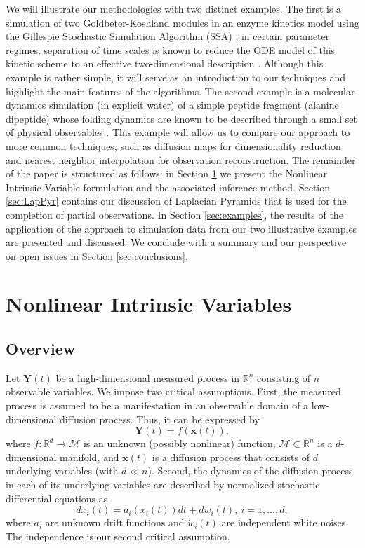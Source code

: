 \documentclass[aip,jcp,preprint]{revtex4-1}
\begin{document}
We will illustrate our methodologies with two distinct examples.
%
The first is a simulation
of two Goldbeter-Koshland modules in an enzyme kinetics model using the Gillespie Stochastic Simulation
Algorithm (SSA) \cite{gillespie1977exact};
in certain parameter regimes, separation of time scales is known
to reduce the ODE model of this kinetic scheme to an effective two-dimensional description \cite{zagaris2012stability}.
%
Although this example is rather simple, it will serve as an introduction to our techniques and highlight the main features of the algorithms.
%
The second example is a molecular dynamics
simulation (in explicit water) of a simple peptide fragment (alanine dipeptide) whose folding
dynamics are known to be described through a small set of physical observables \cite{bolhuis2000reaction}.
%
This example will allow us to compare our approach to more common techniques,
such as diffusion maps \cite{coifman2005geometric} for dimensionality reduction
and nearest neighbor interpolation for observation reconstruction.
%
The remainder of the paper is structured as follows: in Section \ref{sec:NIV} we present the Nonlinear Intrinsic Variable formulation and
the associated inference method.
%
Section \ref{sec:LapPyr} contains our discussion of Laplacian Pyramids that
is used for the completion of partial observations.
%
In Section \ref{sec:examples}, the results
of the application of the approach to simulation data from our two illustrative examples are presented and discussed.
%
We conclude with a summary and our perspective on open issues in Section \ref{sec:conclusions}.

\section{Nonlinear Intrinsic Variables} \label{sec:NIV}

\subsection{Overview}
Let $\mathbf{Y}(t)$ be a high-dimensional measured process in $\mathbb{R}^n$ consisting of $n$ observable variables.
%
We impose two critical assumptions. First, the measured process is assumed to be a manifestation in an observable domain of a low-dimensional diffusion process. Thus, it can be expressed by
\begin{equation}
	\mathbf{Y}(t) = f(\mathbf{x}(t)),
\end{equation}
where $f:\mathbb{R}^d \rightarrow \mathcal{M}$ is an unknown (possibly nonlinear) function, $\mathcal{M} \subset \mathbb{R}^n$ is a $d$-dimensional manifold,
and $\mathbf{x}(t)$ is a diffusion process that consists of $d$ underlying variables (with $d \ll n$).
%
Second, the dynamics of the diffusion process in each of its underlying variables are described by normalized stochastic differential equations as
\begin{equation}
	d x_i(t) = a_i (x_i(t)) dt + d w_i(t), \ i=1,\ldots,d,
\end{equation}
where $a_i$ are unknown drift functions and $\dot{w}_i(t)$ are independent white noises.
%
The independence is our second critical assumption.
\end{document}
